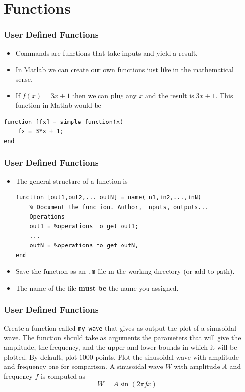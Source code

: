 \documentclass[11pt,xcolor={svgnames},aspectratio=169,usepdftitle=false,notheorems]{beamer}
\begin{document}
\section{Functions}

\begin{frame}[fragile]
    \frametitle{User Defined Functions}
\begin{itemize}
    \item Commands are functions that take inputs and yield a result.
    \item In Matlab we can create our own functions just like in the mathematical sense.
    \item If $f(x) = 3x + 1$ then we can plug any $x$ and the result is $3x + 1$. This function in Matlab would be
\end{itemize}
\begin{lstlisting}
function [fx] = simple_function(x)
    fx = 3*x + 1;
end
\end{lstlisting}
\end{frame}

\begin{frame}[fragile]
    \frametitle{User Defined Functions}
\begin{itemize}
    \item The general structure of a function is
\begin{lstlisting}
function [out1,out2,...,outN] = name(in1,in2,...,inN)
    % Document the function. Author, inputs, outputs...
    Operations
    out1 = %operations to get out1;
    ...
    outN = %operations to get outN;
end
\end{lstlisting}
    \item Save the function as an \verb;.m; file in the working directory (or add to path).
    \item The name of the file \alert{\textbf{must be}} the name you assigned.
\end{itemize}
\end{frame}

\begin{frame}[fragile]
    \frametitle{User Defined Functions}
\begin{exercise}
Create a function called \verb;my_wave; that gives as output the plot of a sinusoidal wave. The function should take as arguments the parameters that will give the amplitude, the frequency, and the upper and lower bounds in which it will be plotted. By default, plot $1000$ points. Plot the sinusoidal wave with amplitude and frequency one for comparison. A sinusoidal wave $W$ with amplitude $A$ and frequency $f$ is computed as 
\[
W = A \sin(2\pi f x)
\]
\end{exercise}
\end{frame}
\end{document}
